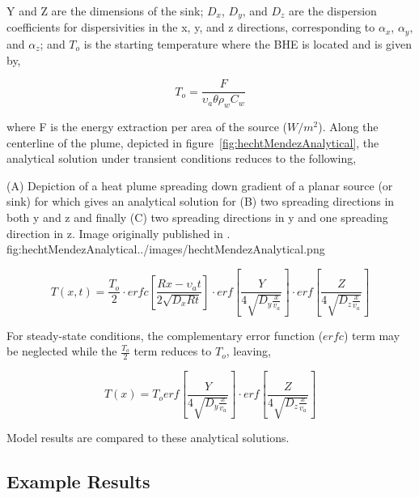 Y and Z are the dimensions of the sink; $D_x$, $D_y$, and $D_z$ are the dispersion coefficients for dispersivities in the x, y, and z directions, corresponding to $\alpha_x$, $\alpha_y$, and $\alpha_z$; and $T_o$ is the starting temperature where the BHE is located and is given by,

\begin{equation*}
T_o = \frac{F}{\upsilon_a \theta \rho_w C_w}
\end{equation*}
 
where F is the energy extraction per area of the source ($W/m^2$).  Along the centerline of the plume, depicted in figure~\ref{fig:hechtMendezAnalytical}, the analytical solution under transient conditions reduces to the following,

\begin{StandardFigure}{
                                     (A) Depiction of a heat plume spreading down gradient of a planar source (or sink) for which \citep{domenico1985} gives an analytical solution for (B) two spreading directions in both y and z and finally (C) two spreading directions in y and one spreading direction in z.  Image originally published in \cite{hecht2008}.
                                     }{fig:hechtMendezAnalytical}{../images/hechtMendezAnalytical.png}
\end{StandardFigure}       

\begin{equation*}
T \left( x, t \right) = \frac{T_o}{2} \cdot erfc \left[ \frac{Rx - \upsilon_a t}{2 \sqrt{D_x R t}} \right] \cdot erf \left[ \frac{ Y }{4 \sqrt{D_y \frac{x}{v_a}}} \right] \cdot  erf \left[ \frac{ Z }{4 \sqrt{D_z \frac{x}{v_a}}} \right] 
\end{equation*}
 
For steady-state conditions, the complementary error function ($erfc$) term may be neglected while the $\frac {T_o}{2}$ term reduces to $T_o$, leaving,

\begin{equation*}
T \left( x \right) = T_o erf \left[ \frac{ Y }{4 \sqrt{D_y \frac{x}{v_a}}} \right] \cdot  erf \left[ \frac{ Z }{4 \sqrt{D_z \frac{x}{v_a}}} \right] 
\end{equation*}

Model results are compared to these analytical solutions.  

\subsection{Example Results}

